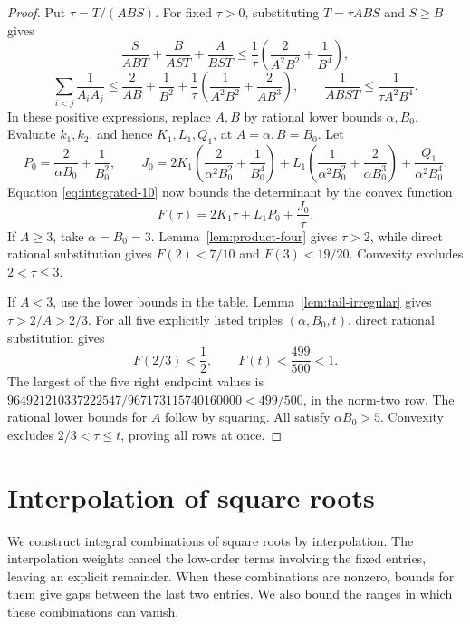 \documentclass[12pt]{article}
\numberwithin{equation}{section}
\begin{document}
\begin{proof}
Put \(\tau=T/(ABS)\). For fixed \(\tau>0\), substituting
\(T=\tau ABS\) and \(S\ge B\) gives
\[
 \frac{S}{ABT}+\frac{B}{AST}+\frac{A}{BST}
 \le\frac1\tau\left(\frac2{A^2B^2}+\frac1{B^4}\right),
\]
\[
 \sum_{i<j}\frac1{A_iA_j}
 \le\frac2{AB}+\frac1{B^2}
       +\frac1\tau\left(\frac1{A^2B^2}+\frac2{AB^3}\right),
 \qquad
 \frac1{ABST}\le\frac1{\tau A^2B^4}.
\]
In these positive expressions, replace \(A,B\) by rational lower
bounds \(\alpha,B_0\). Evaluate \(k_1,k_2\), and hence
\(K_1,L_1,Q_1\), at \(A=\alpha,B=B_0\). Let
\[
 P_0=\frac2{\alpha B_0}+\frac1{B_0^2},\qquad
 J_0=2K_1\left(\frac2{\alpha^2B_0^2}+\frac1{B_0^4}\right)
 +L_1\left(\frac1{\alpha^2B_0^2}+\frac2{\alpha B_0^3}\right)
 +\frac{Q_1}{\alpha^2B_0^4}.
\]
Equation \eqref{eq:integrated-10} now bounds the determinant by the convex function
\[
 F(\tau)=2K_1\tau+L_1P_0+\frac{J_0}{\tau}.
\]
If \(A\ge3\), take \(\alpha=B_0=3\).
Lemma~\ref{lem:product-four} gives \(\tau>2\), while direct rational
substitution gives \(F(2)<7/10\) and \(F(3)<19/20\).
Convexity excludes \(2<\tau\le3\).

If \(A<3\), use the lower bounds in the table.
Lemma~\ref{lem:tail-irregular} gives \(\tau>2/A>2/3\).
For all five explicitly listed triples \((\alpha,B_0,t)\), direct rational
substitution gives
\[
 F(2/3)<\frac12,\qquad F(t)<\frac{499}{500}<1.
\]
The largest of the five right endpoint values is
\(964921210337222547/967173115740160000<499/500\),
in the norm-two row. The rational lower bounds for \(A\) follow by squaring.
All satisfy \(\alpha B_0>5\).
Convexity excludes \(2/3<\tau\le t\), proving all rows at once.
\end{proof}

\section{Interpolation of square roots}

We construct integral combinations of square roots by interpolation. The interpolation weights cancel the low-order terms involving the fixed entries, leaving an explicit remainder. When these combinations are nonzero, bounds for them give gaps between the last two entries. We also bound the ranges in which these combinations can vanish.
\end{document}
